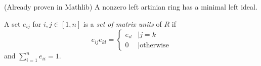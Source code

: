   \begin{theorem}
    (Already proven in Mathlib) A nonzero left artinian ring has a minimal left ideal.
  \end{theorem}

  \begin{definition}
    \label{def:matrixunits}
    A set $e_{ij}$ for $i, j \in [1, n]$ is a \textit{set of matrix units} of $R$ if 
    $$
      e_{ij}e_{kl} = 
      \begin{cases} 
        e_{il} &\mid j = k \\ 
        0 &\mid \text{otherwise} \end{cases}
    $$ 
    and $\sum_{i=1}^n e_{ii} = 1$.
  \end{definition}

